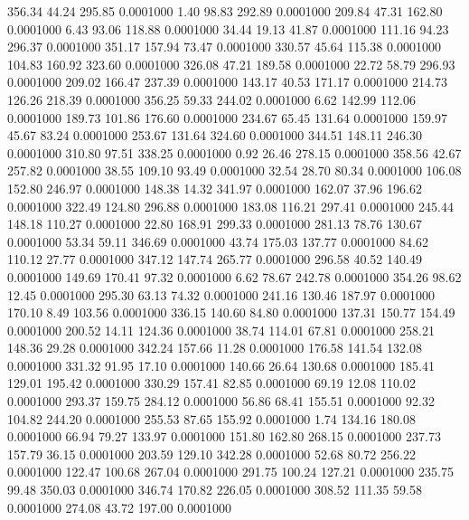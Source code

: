  356.34   44.24  295.85   0.0001000
   1.40   98.83  292.89   0.0001000
 209.84   47.31  162.80   0.0001000
   6.43   93.06  118.88   0.0001000
  34.44   19.13   41.87   0.0001000
 111.16   94.23  296.37   0.0001000
 351.17  157.94   73.47   0.0001000
 330.57   45.64  115.38   0.0001000
 104.83  160.92  323.60   0.0001000
 326.08   47.21  189.58   0.0001000
  22.72   58.79  296.93   0.0001000
 209.02  166.47  237.39   0.0001000
 143.17   40.53  171.17   0.0001000
 214.73  126.26  218.39   0.0001000
 356.25   59.33  244.02   0.0001000
   6.62  142.99  112.06   0.0001000
 189.73  101.86  176.60   0.0001000
 234.67   65.45  131.64   0.0001000
 159.97   45.67   83.24   0.0001000
 253.67  131.64  324.60   0.0001000
 344.51  148.11  246.30   0.0001000
 310.80   97.51  338.25   0.0001000
   0.92   26.46  278.15   0.0001000
 358.56   42.67  257.82   0.0001000
  38.55  109.10   93.49   0.0001000
  32.54   28.70   80.34   0.0001000
 106.08  152.80  246.97   0.0001000
 148.38   14.32  341.97   0.0001000
 162.07   37.96  196.62   0.0001000
 322.49  124.80  296.88   0.0001000
 183.08  116.21  297.41   0.0001000
 245.44  148.18  110.27   0.0001000
  22.80  168.91  299.33   0.0001000
 281.13   78.76  130.67   0.0001000
  53.34   59.11  346.69   0.0001000
  43.74  175.03  137.77   0.0001000
  84.62  110.12   27.77   0.0001000
 347.12  147.74  265.77   0.0001000
 296.58   40.52  140.49   0.0001000
 149.69  170.41   97.32   0.0001000
   6.62   78.67  242.78   0.0001000
 354.26   98.62   12.45   0.0001000
 295.30   63.13   74.32   0.0001000
 241.16  130.46  187.97   0.0001000
 170.10    8.49  103.56   0.0001000
 336.15  140.60   84.80   0.0001000
 137.31  150.77  154.49   0.0001000
 200.52   14.11  124.36   0.0001000
  38.74  114.01   67.81   0.0001000
 258.21  148.36   29.28   0.0001000
 342.24  157.66   11.28   0.0001000
 176.58  141.54  132.08   0.0001000
 331.32   91.95   17.10   0.0001000
 140.66   26.64  130.68   0.0001000
 185.41  129.01  195.42   0.0001000
 330.29  157.41   82.85   0.0001000
  69.19   12.08  110.02   0.0001000
 293.37  159.75  284.12   0.0001000
  56.86   68.41  155.51   0.0001000
  92.32  104.82  244.20   0.0001000
 255.53   87.65  155.92   0.0001000
   1.74  134.16  180.08   0.0001000
  66.94   79.27  133.97   0.0001000
 151.80  162.80  268.15   0.0001000
 237.73  157.79   36.15   0.0001000
 203.59  129.10  342.28   0.0001000
  52.68   80.72  256.22   0.0001000
 122.47  100.68  267.04   0.0001000
 291.75  100.24  127.21   0.0001000
 235.75   99.48  350.03   0.0001000
 346.74  170.82  226.05   0.0001000
 308.52  111.35   59.58   0.0001000
 274.08   43.72  197.00   0.0001000
